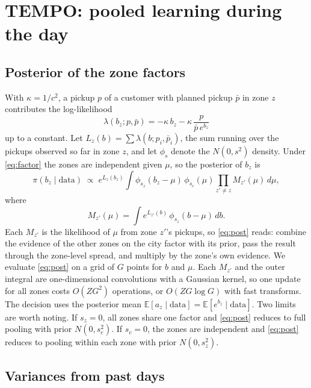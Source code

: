 \documentclass[preprint,authoryear,12pt]{elsarticle}
\newcommand{\E}{\mathbb{E}}
\begin{document}
\section{TEMPO: pooled learning during the day}\label{sec:method}

\subsection{Posterior of the zone factors}

With $\kappa = 1/c^2$, a pickup $p$ of a customer with planned pickup
$\bar p$ in zone $z$ contributes the log-likelihood
\begin{equation}\label{eq:loglik}
\lambda(b_z; p, \bar p) = -\kappa\, b_z - \kappa\, \frac{p}{\bar p\, e^{b_z}}
\end{equation}
up to a constant. Let $L_z(b) = \sum \lambda(b; p_i, \bar p_i)$, the sum
running over the pickups observed so far in zone $z$, and let $\phi_s$
denote the $N(0,s^2)$ density. Under \eqref{eq:factor} the zones are
independent given $\mu$, so the posterior of $b_z$ is
\begin{equation}\label{eq:post}
\pi(b_z \mid \text{data}) \;\propto\; e^{L_z(b_z)} \int
\phi_{s_z}(b_z - \mu)\, \phi_{s_c}(\mu) \prod_{z' \ne z} M_{z'}(\mu)
\, d\mu,
\end{equation}
where
\begin{equation}\label{eq:Mz}
M_{z'}(\mu) = \int e^{L_{z'}(b)}\, \phi_{s_z}(b - \mu)\, db .
\end{equation}
Each $M_{z'}$ is the likelihood of $\mu$ from zone $z'$'s pickups, so
\eqref{eq:post} reads: combine the evidence of the other zones on the
city factor with its prior, pass the result through the zone-level
spread, and multiply by the zone's own evidence. We evaluate
\eqref{eq:post} on a grid of $G$ points for $b$ and $\mu$. Each $M_{z'}$
and the outer integral are one-dimensional convolutions with a Gaussian
kernel, so one update for all zones costs $O(Z G^2)$ operations, or
$O(Z G \log G)$ with fast transforms. The decision uses the posterior
mean $\E[a_z \mid \text{data}] = \E[e^{b_z} \mid \text{data}]$. Two
limits are worth noting. If $s_z = 0$, all zones share one factor and
\eqref{eq:post} reduces to full pooling with prior $N(0,s_c^2)$. If
$s_c = 0$, the zones are independent and \eqref{eq:post} reduces to
pooling within each zone with prior $N(0,s_z^2)$.

\subsection{Variances from past days}
\end{document}
